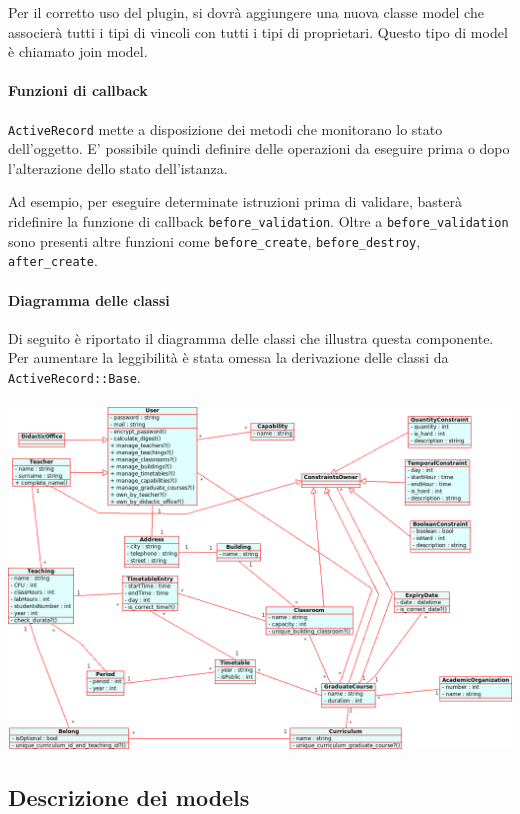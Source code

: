 \documentclass[11pt,a4paper]{article}
\begin{document}
Per il corretto uso del plugin, si dovrà aggiungere una nuova classe model che associerà tutti i tipi di vincoli con tutti i tipi di proprietari. Questo tipo di model è chiamato join model.




\paragraph{Funzioni di callback}
\verb|ActiveRecord| mette a disposizione dei metodi che monitorano lo stato dell'oggetto. 
E' possibile quindi definire delle operazioni da eseguire prima o dopo l'alterazione dello stato dell'istanza.


Ad esempio, per eseguire determinate istruzioni prima di validare, basterà ridefinire la funzione di callback \verb|before_validation|.
Oltre a \verb|before_validation| sono presenti altre funzioni come \verb|before_create|, \verb|before_destroy|, \verb|after_create|.

\paragraph{Diagramma delle classi}
Di seguito è riportato il diagramma delle classi che illustra questa componente. Per aumentare la leggibilità è stata omessa la derivazione delle classi da \verb|ActiveRecord::Base|. \\
\bigskip \\
\includegraphics[scale=0.34]{images/Model_ClassDiagram.png}

\subsection{Descrizione dei models}
\end{document}
